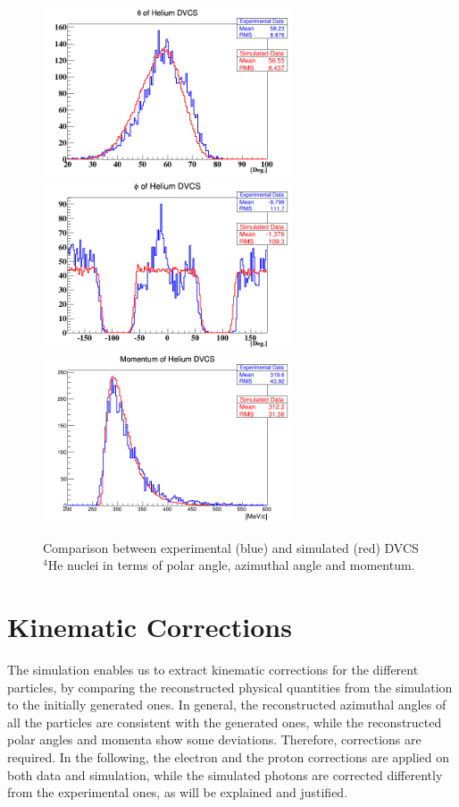 \begin{figure}[tpb]
   \includegraphics[height=5.0cm]{fig_rtpc/updates/He_theta.png}
   \includegraphics[height=5.0cm]{fig_rtpc/updates/He_phi.png}
   \centering
   \includegraphics[height=5.0cm]{fig_rtpc/updates/He_mom.png}
   \caption{Comparison between experimental (blue) and simulated (red) DVCS 
   $^{4}$He nuclei in terms of polar angle, azimuthal angle and momentum.}
   \label{fig:comp_He}
\end{figure}


\section{Kinematic Corrections}
The simulation enables us to extract kinematic corrections for the different particles, by comparing the reconstructed physical quantities from the simulation to the initially generated ones. In general, the reconstructed azimuthal angles of all the particles are consistent with the generated ones, while the reconstructed polar angles and momenta show some deviations. Therefore, corrections are required. In the following, the electron and the proton corrections are applied on both data and simulation, while the simulated photons are corrected differently from the experimental ones, as will be explained and justified. 

